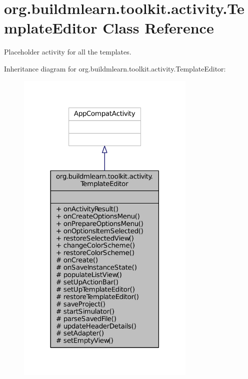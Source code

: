 \hypertarget{classorg_1_1buildmlearn_1_1toolkit_1_1activity_1_1TemplateEditor}{\section{org.\-buildmlearn.\-toolkit.\-activity.\-Template\-Editor Class Reference}
\label{classorg_1_1buildmlearn_1_1toolkit_1_1activity_1_1TemplateEditor}
}


Placeholder activity for all the templates.  




Inheritance diagram for org.\-buildmlearn.\-toolkit.\-activity.\-Template\-Editor\-:
\nopagebreak
\begin{figure}[H]
\begin{center}
\leavevmode
\includegraphics[width=242pt]{d4/da7/classorg_1_1buildmlearn_1_1toolkit_1_1activity_1_1TemplateEditor__inherit__graph}
\end{center}
\end{figure}


